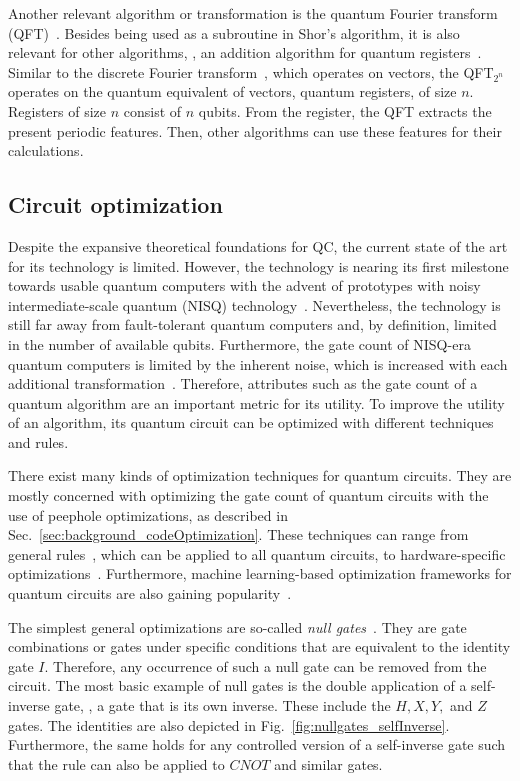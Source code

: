 Another relevant algorithm or transformation is the quantum Fourier transform (QFT)~\cite{Copp02}. Besides being used as a subroutine in Shor's algorithm, it is also relevant for other algorithms, \eg, an addition algorithm for quantum registers~\cite{Drap00}. Similar to the discrete Fourier transform~\cite{Wino78}, which operates on vectors, the QFT$_{2^n}$ operates on the quantum equivalent of vectors, quantum registers, of size $n$. Registers of size $n$ consist of $n$ qubits. From the register, the QFT extracts the present periodic features. Then, other algorithms can use these features for their calculations.

\subsection{Circuit optimization}
\label{sec:background_circuitOptimization}
Despite the expansive theoretical foundations for QC, the current state of the art for its technology is limited. However, the technology is nearing its first milestone towards usable quantum computers with the advent of prototypes with noisy intermediate-scale quantum (NISQ) technology~\cite{BFA22}. Nevertheless, the technology is still far away from fault-tolerant quantum computers and, by definition, limited in the number of available qubits. Furthermore, the gate count of NISQ-era quantum computers is limited by the inherent noise, which is increased with each additional transformation~\cite{Pres18}. Therefore, attributes such as the gate count of a quantum algorithm are an important metric for its utility. To improve the utility of an algorithm, its quantum circuit can be optimized with different techniques and rules.

There exist many kinds of optimization techniques for quantum circuits. They are mostly concerned with optimizing the gate count of quantum circuits with the use of peephole optimizations, as described in Sec.~\ref{sec:background_codeOptimization}. These techniques can range from general rules~\cite{GaCh11, LBZ21}, which can be applied to all quantum circuits, to hardware-specific optimizations~\cite{KMO*23}. Furthermore, machine learning-based optimization frameworks for quantum circuits are also gaining popularity~\cite{FNML21,LPM*24, RLB*24}.

The simplest general optimizations are so-called \emph{null gates}~\cite{GaCh11}. They are gate combinations or gates under specific conditions that are equivalent to the identity gate $I$. Therefore, any occurrence of such a null gate can be removed from the circuit. The most basic example of null gates is the double application of a self-inverse gate, \ie, a gate that is its own inverse. These include the $H, X, Y,$ and $Z$ gates. The identities are also depicted in Fig.~\ref{fig:nullgates_selfInverse}.
Furthermore, the same holds for any controlled version of a self-inverse gate such that the rule can also be applied to $CNOT$ and similar gates. 

